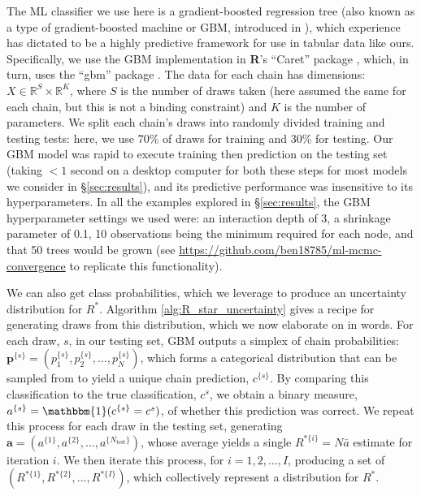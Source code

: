 \documentclass{article}
\begin{document}
The ML classifier we use here is a gradient-boosted regression tree (also known as a type of gradient-boosted machine or GBM, introduced in \cite{friedman2001greedy}), which experience has dictated to be a highly predictive framework for use in tabular data \citep{chollet2018} like ours. Specifically, we use the GBM implementation in \textbf{\textsf{R}}'s ``Caret'' package \citep{kuhn2008building}, which, in turn, uses the ``gbm'' package \citep{greenwell2019package}. The data for each chain has dimensions: $X\in \mathbb{R}^{S}\times \mathbb{R}^{K}$, where $S$ is the number of draws taken (here assumed the same for each chain, but this is not a binding constraint) and $K$ is the number of parameters. We split each chain's draws into randomly divided training and testing tests: here, we use 70\% of draws for training and 30\% for testing. Our GBM model was rapid to execute training then prediction on the testing set (taking $<1$ second on a desktop computer for both these steps for most models we consider in \S\ref{sec:results}), and its predictive performance was insensitive to its hyperparameters. In all the examples explored in \S\ref{sec:results}, the GBM hyperparameter settings we used were: an interaction depth of 3, a shrinkage parameter of 0.1, 10 observations being the minimum required for each node, and that 50 trees would be grown (see \url{https://github.com/ben18785/ml-mcmc-convergence} to replicate this functionality).

We can also get class probabilities, which we leverage to produce an uncertainty distribution for $R^*$. Algorithm \ref{alg:R_star_uncertainty} gives a recipe for generating draws from this distribution, which we now elaborate on in words. For each draw, $s$, in our testing set, GBM outputs a simplex of chain probabilities: $\boldsymbol{p}^{\{s\}}=(p_1^{\{s\}},p_2^{\{s\}},...,p_N^{\{s\}})$, which forms a categorical distribution that can be sampled from to yield a unique chain prediction, $c^{\{s\}}$. By comparing this classification to the true classification, $c^s$, we obtain a binary measure, $a^{\{s\}}=\mathbbm{1}(c^{\{s\}}=c^s)$, of whether this prediction was correct. We repeat this process for each draw in the testing set, generating $\boldsymbol{a}=(a^{\{1\}},a^{\{2\}},...,a^{\{N_\text{test}\}})$, whose average yields a single $R^{*\{i\}}=N \bar{a}$ estimate for iteration $i$. We then iterate this process, for $i=1,2,...,I$, producing a set of $(R^{*\{1\}},R^{*\{2\}},...,R^{*\{I\}})$, which collectively represent a distribution for $R^*$. 
\end{document}
